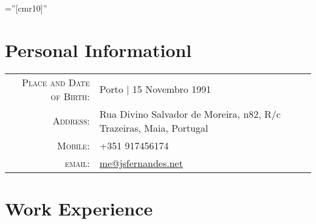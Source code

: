 \documentclass[a4paper,10pt]{article} %
\begin{document}
\pagestyle{empty} %

\font\fb=''[cmr10]'' %


\par{\bigskip\par} %

\section{Personal Informationl}

\begin{tabular}{rl}
\textsc{Place and Date of Birth:} & Porto  | 15 Novembro 1991 \\
\textsc{Address:} & Rua Divino Salvador de Moreira, n82, R/c Trazeiras, Maia, Portugal \\
\textsc{Mobile:} & +351 917456174\\
\textsc{email:} & \href{mailto:me@jsfernandes.net}{me@jsfernandes.net}
\end{tabular}


\section{Work Experience}
\end{document}
